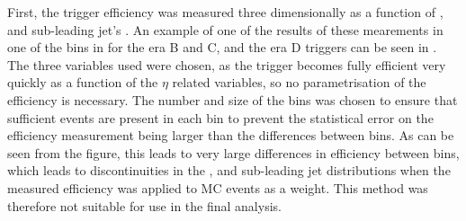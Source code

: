First, the trigger efficiency was measured three dimensionally as a function of \METnoMU, \Mjj and sub-leading jet's \pt. An example of one of the results of these mearements in one of the bins in \METnoMU for the era B and C, and the era D triggers can be seen in . The three variables used were chosen, as the trigger becomes fully efficient very quickly as a function of the $\eta$ related variables, so no parametrisation of the efficiency is necessary. The number and size of the bins was chosen to ensure that sufficient events are present in each bin to prevent the statistical error on the efficiency measurement being larger than the differences between bins. As can be seen from the figure, this leads to very large differences in efficiency between bins, which leads to discontinuities in the \METnoMU, \Mjj and sub-leading jet \pt distributions when the measured efficiency was applied to \ac{MC} events as a weight. This method was therefore not suitable for use in the final analysis.
